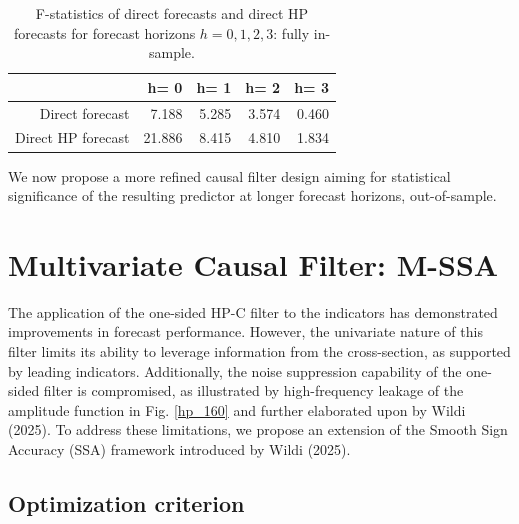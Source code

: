 \documentclass[a4paper]{article}
\begin{document}
\begin{table}[ht]
\centering
\begin{tabular}{rrrrr}
  \hline
 & h= 0 & h= 1 & h= 2 & h= 3 \\ 
  \hline
Direct forecast & 7.188 & 5.285 & 3.574 & 0.460 \\ 
  Direct HP forecast & 21.886 & 8.415 & 4.810 & 1.834 \\ 
   \hline
\end{tabular}
\caption{F-statistics of direct forecasts and direct HP forecasts for forecast horizons $h=0,1,2,3$: fully in-sample.  } 
\label{f_stat}
\end{table}We now propose a more refined causal filter design aiming for statistical significance of the resulting predictor at longer forecast horizons, out-of-sample.   




\section{Multivariate Causal Filter: M-SSA}

The application of the one-sided HP-C filter to the indicators has demonstrated improvements in forecast performance. However, the univariate nature of this filter limits its ability to leverage information from the cross-section, as supported by leading indicators. Additionally, the noise suppression capability of the one-sided filter is compromised, as illustrated by high-frequency leakage of the amplitude function in Fig. \eqref{hp_160} and further elaborated upon by Wildi (2025). To address these limitations, we propose an extension of the Smooth Sign Accuracy (SSA) framework introduced by Wildi (2025).


\subsection{Optimization criterion}
\end{document}
